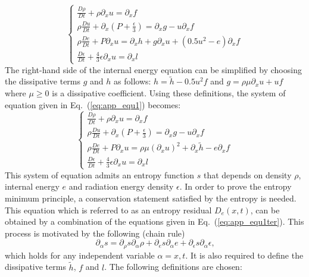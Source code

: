 \documentclass[review]{elsarticle}
\newcommand{\eqt}[1]{Eq.~(\ref{#1})}                     %
\begin{document}
\begin{appendices}
\begin{equation}
\label{eq:app_equ1}
\left\{
\begin{array}{llll}
\frac{D \rho}{Dt} + \rho \partial_x u = \partial_x f \\
\rho \frac{Du}{Dt} + \partial_x \left( P + \frac{\epsilon}{3} \right) = \partial_x g - u \partial_x f  \\
\rho \frac{De}{Dt} + P \partial_x u = \partial_x h + g \partial_x u + \left( 0.5 u^2 - e \right) \partial_x f \\
\frac{D\epsilon}{Dt} + \frac{4}{3} \epsilon \partial_x u = \partial_x l
\end{array}
\right.
\end{equation}
The right-hand side of the internal energy equation can be simplified by choosing the dissipative terms $g$ and $h$ as follows: $h = \tilde{h} -0.5 u^2 f$ and $g = \rho \mu \partial_x u + uf$ where $\mu \geq 0$ is a dissipative coefficient. Using these definitions, the system of equation given in \eqt{eq:app_equ1} becomes:
\begin{equation}
\label{eq:app_equ1ter}
\left\{
\begin{array}{llll}
\frac{D \rho}{Dt} + \rho \partial_x u = \partial_x f \\
\rho \frac{Du}{Dt} + \partial_x \left( P + \frac{\epsilon}{3} \right) = \partial_x g - u \partial_x f  \\
\rho \frac{De}{Dt} + P \partial_x u = \rho \mu (\partial_x u)^2 + \partial_x \tilde{h} - e \partial_x f \\
\frac{D\epsilon}{Dt} + \frac{4}{3} \epsilon \partial_x u = \partial_x l
\end{array}
\right.
\end{equation}
This system of equation admits an entropy function $s$ that depends on density $\rho$, internal energy $e$ and radiation energy density $\epsilon$. In order to prove the entropy minimum principle, a conservation statement satisfied by the entropy is needed. This equation which is referred to as an entropy residual $D_e(x,t)$, can be obtained by a combination of the equations given in \eqt{eq:app_equ1ter}. This process is motivated by the following (chain rule) 
\begin{equation}
\label{eq:app_equ2}
\partial_{\alpha} s = \partial_{\rho} s \partial_{\alpha} \rho +  \partial_{e} s \partial_{\alpha}e +  \partial_{\epsilon} s \partial_{\alpha} \epsilon \text{,}
\end{equation}
 which holds for any independent variable $\alpha=x,t$. It is also required to define the dissipative terms $\tilde{h}$, $f$ and $l$. The following definitions are chosen:

\end{appendices}
\end{document}
